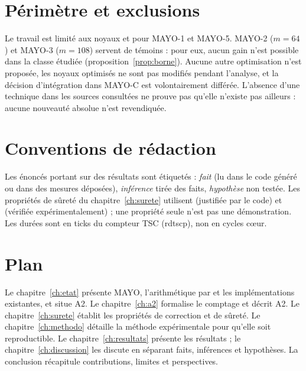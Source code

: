 \section{Périmètre et exclusions}
Le travail est limité aux noyaux  et  pour MAYO-1 et MAYO-5. MAYO-2 ($m=64$) et MAYO-3 ($m=108$) servent de témoins : pour eux, aucun gain n'est possible dans la classe étudiée (proposition~\ref{prop:borne}). Aucune autre optimisation n'est proposée, les noyaux optimisés ne sont pas modifiés pendant l'analyse, et la décision d'intégration dans MAYO-C est volontairement différée. L'absence d'une technique dans les sources consultées ne prouve pas qu'elle n'existe pas ailleurs : aucune nouveauté absolue n'est revendiquée.

\section{Conventions de rédaction}
Les énoncés portant sur des résultats sont étiquetés : \F{} \emph{fait} (lu dans le code généré ou dans des mesures déposées), \I{} \emph{inférence} tirée des faits, \Hy{} \emph{hypothèse} non testée. Les propriétés de sûreté du chapitre~\ref{ch:surete} utilisent \Pc{} (justifiée par le code) et \Pe{} (vérifiée expérimentalement) ; une propriété \Pe{} seule n'est pas une démonstration. Les durées sont en ticks du compteur TSC (rdtscp), non en cycles cœur.

\section{Plan}
Le chapitre~\ref{ch:etat} présente MAYO, l'arithmétique par \vpshufb{} et les implémentations existantes, et situe A2. Le chapitre~\ref{ch:a2} formalise le comptage et décrit A2. Le chapitre~\ref{ch:surete} établit les propriétés de correction et de sûreté. Le chapitre~\ref{ch:methodo} détaille la méthode expérimentale pour qu'elle soit reproductible. Le chapitre~\ref{ch:resultats} présente les résultats ; le chapitre~\ref{ch:discussion} les discute en séparant faits, inférences et hypothèses. La conclusion récapitule contributions, limites et perspectives.
